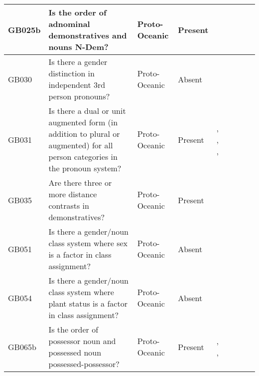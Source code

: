 \documentclass[a4paper,10pt]{article} %
\begin{document}
\begin{landscape}
\begin{longtable}{| p{2cm}| p{3cm}| p{2.5cm}|p{2cm}|p{2cm}|p{2cm}|p{2cm}|p{2cm}|p{2cm}|}
GB025b&Is the order of adnominal demonstratives and nouns N-Dem?&Proto-Oceanic&Present&\citet[72]{lynchrosscrowley_proto_grammar_oceanic}& \cellcolor{hedvig_lightgreen!50}{True Positive} & \cellcolor{hedvig_yellow!50}{Half} & \cellcolor{hedvig_lightgreen!50}{True Positive} & \cellcolor{hedvig_yellow!50}{Half} \\ \hline
GB030&Is there a gender distinction in independent 3rd person pronouns?&Proto-Oceanic&Absent&\citet[498]{ross2004morphosyntactic}& \cellcolor{hedvig_lightgreen!50}{True Negative} & \cellcolor{hedvig_yellow!50}{Half} & \cellcolor{hedvig_yellow!50}{True Negative} & \cellcolor{hedvig_yellow!50}{Half} \\ \hline
GB031&Is there a dual or unit augmented form (in addition to plural or augmented) for all person categories in the pronoun system?&Proto-Oceanic&Present&\citet[498]{ross2004morphosyntactic}, \citet[109]{kikusawa2001rotuman}, \citet[69]{lynchrosscrowley_proto_grammar_oceanic}, \citet[173]{pawley1973some}& \cellcolor{hedvig_lightgreen!50}{True Positive} & \cellcolor{hedvig_yellow!50}{Half} & \cellcolor{hedvig_lightgreen!50}{True Positive} & \cellcolor{hedvig_yellow!50}{Half} \\ \hline
GB035&Are there three or more distance contrasts in demonstratives?&Proto-Oceanic&Present&\citet[72]{lynchrosscrowley_proto_grammar_oceanic}& \cellcolor{hedvig_lightgreen!50}{True Positive} & \cellcolor{hedvig_yellow!50}{Half} & \cellcolor{hedvig_lightgreen!50}{True Positive} & \cellcolor{hedvig_yellow!50}{False Negative} \\ \hline
GB051&Is there a gender/noun class system where sex is a factor in class assignment?&Proto-Oceanic&Absent&\citet[498]{ross2004morphosyntactic}& \cellcolor{hedvig_lightgreen!50}{True Negative} & \cellcolor{hedvig_yellow!50}{Half} & \cellcolor{hedvig_yellow!50}{True Negative} & \cellcolor{hedvig_red!50}{False Positive} \\ \hline
GB054&Is there a gender/noun class system where plant status is a factor in class assignment?&Proto-Oceanic&Absent&\citet[498]{ross2004morphosyntactic}& \cellcolor{hedvig_lightgreen!50}{True Negative} & \cellcolor{hedvig_yellow!50}{Half} & \cellcolor{hedvig_yellow!50}{True Negative} & \cellcolor{hedvig_yellow!50}{Half} \\ \hline
GB065b&Is the order of possessor noun and possessed noun possessed-possessor?&Proto-Oceanic&Present&\citet[155-156]{pawley1973some}, \citet[512]{ross2004morphosyntactic}, \citet[77]{lynchrosscrowley_proto_grammar_oceanic}& \cellcolor{hedvig_lightgreen!50}{True Positive} & \cellcolor{hedvig_yellow!50}{Half} & \cellcolor{hedvig_lightgreen!50}{True Positive} & \cellcolor{hedvig_yellow!50}{Half} \\ \hline

\end{longtable}
\end{landscape}
\end{document}
